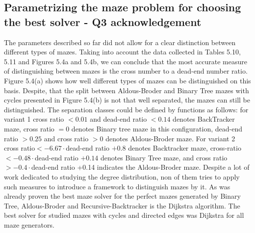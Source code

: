 \subsection{Parametrizing the maze problem for choosing the best solver - Q3 acknowledgement}
The parameters described so far did not allow for a clear distinction between different types of mazes. Taking into account the data collected in Tables 5.10, 5.11 and Figures 5.4a and 5.4b,
we can conclude that the most accurate measure of distinguishing between mazes is the cross number to a dead-end number ratio.
Figure 5.4(a) shows how well different types of mazes can be distinguished on this basis. Despite, that the split between Aldous-Broder and Binary Tree
mazes with cycles presented in Figure 5.4(b) is not that well separated, the mazes can still be distinguished. 
The separation classes could be defined by functions as follows: for variant 1 cross ratio $< 0.01$ and dead-end ratio $< 0.14$ denotes BackTracker maze,
cross ratio $= 0$ denotes Binary tree maze in this configuration, dead-end ratio $> 0.25$ and cross ratio $> 0$ denotes Aldous-Broder maze.
For variant 2 cross ratio$ < -6.67\cdot$dead-end ratio $+ 0.8$ denotes Backtracker maze, cross-ratio $< -0.48\cdot$dead-end ratio $+0.14$ denotes Binary Tree maze, 
and cross ratio$ > -0.4\cdot$dead-end ratio +0.14 indicates the Aldous-Broder maze.
Despite a lot of work dedicated to studying the degree distribution, non of them tries to apply such measures to introduce a framework to distinguish mazes by it.
As was already proven the best maze solver for the perfect mazes generated by Binary Tree, Aldous-Broder and Recursive-Backtracker is the Dijkstra algorithm.
The best solver for studied mazes with cycles and directed edges was Dijkstra for all maze generators.
